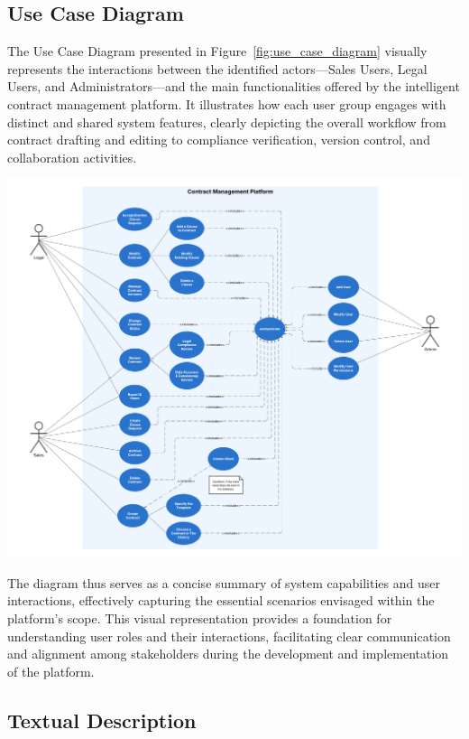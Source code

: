 \subsection{Use Case Diagram}
The Use Case Diagram presented in Figure~\ref{fig:use_case_diagram} visually represents the interactions between the identified actors—Sales Users, Legal Users, and Administrators—and the main functionalities offered by the intelligent contract management platform. It illustrates how each user group engages with distinct and shared system features, clearly depicting the overall workflow from contract drafting and editing to compliance verification, version control, and collaboration activities.

\begin{center}
    \centering
    \includegraphics[width=1\textwidth]{Images/Use Case Diagram.png}
    \label{fig:use_case_diagram}
\end{center}

The diagram thus serves as a concise summary of system capabilities and user interactions, effectively capturing the essential scenarios envisaged within the platform’s scope. This visual representation provides a foundation for understanding user roles and their interactions, facilitating clear communication and alignment among stakeholders during the development and implementation of the platform.

\subsection{Textual Description}


